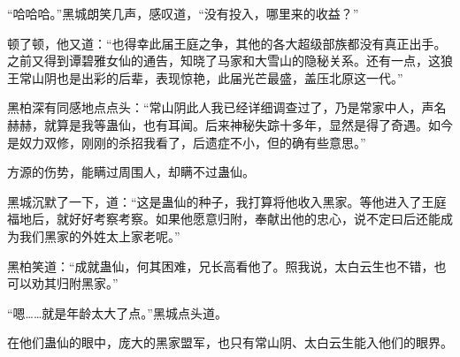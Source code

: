 \begin{this_body}
“哈哈哈。”黑城朗笑几声，感叹道，“没有投入，哪里来的收益？”

顿了顿，他又道：“也得幸此届王庭之争，其他的各大超级部族都没有真正出手。之前又得到谭碧雅女仙的通告，知晓了马家和大雪山的隐秘关系。还有一点，这狼王常山阴也是出彩的后辈，表现惊艳，此届光芒最盛，盖压北原这一代。”

黑柏深有同感地点点头：“常山阴此人我已经详细调查过了，乃是常家中人，声名赫赫，就算是我等蛊仙，也有耳闻。后来神秘失踪十多年，显然是得了奇遇。如今是奴力双修，刚刚的杀招我看了，后遗症不小，但的确有些意思。”

方源的伤势，能瞒过周围人，却瞒不过蛊仙。

黑城沉默了一下，道：“这是蛊仙的种子，我打算将他收入黑家。等他进入了王庭福地后，就好好考察考察。如果他愿意归附，奉献出他的忠心，说不定曰后还能成为我们黑家的外姓太上家老呢。”

黑柏笑道：“成就蛊仙，何其困难，兄长高看他了。照我说，太白云生也不错，也可以劝其归附黑家。”

“嗯……就是年龄太大了点。”黑城点头道。

在他们蛊仙的眼中，庞大的黑家盟军，也只有常山阴、太白云生能入他们的眼界。

\end{this_body}

